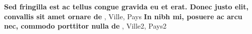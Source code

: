 %
%
%


\begin{scholarship}
					{\textbf{Sed fringilla est ac tellus congue gravida eu et erat. Donec justo elit, convallis sit amet ornare de }, Ville, Pays}
					{\textbf{In nibh mi, posuere ac arcu nec, commodo porttitor nulla de }, Ville2, Pays2}
\end{scholarship}